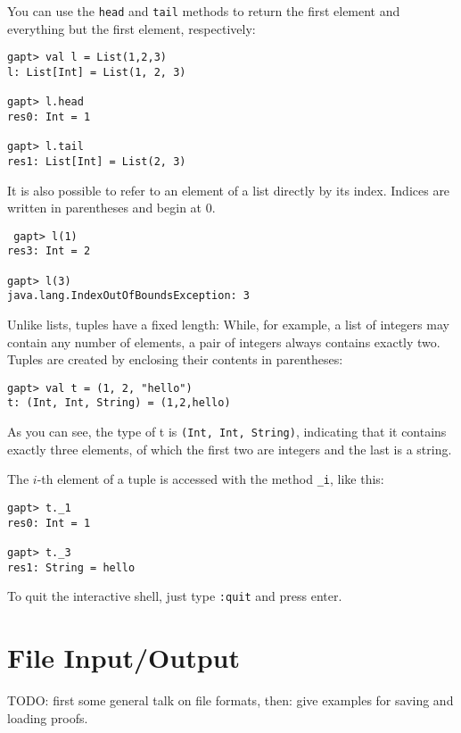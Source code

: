 \documentclass[a4paper,11pt]{article}
\newenvironment{meta}{\color{red}}{\color{black}} %
\begin{document}
You can use the \texttt{head} and \texttt{tail} methods to return the first
element and everything but the first element, respectively:

\begin{lstlisting}
gapt> val l = List(1,2,3)
l: List[Int] = List(1, 2, 3)

gapt> l.head
res0: Int = 1

gapt> l.tail
res1: List[Int] = List(2, 3)
\end{lstlisting}

It is also possible to refer to an element of a list directly by its index. Indices are
written in parentheses and begin at 0.

\begin{lstlisting}
 gapt> l(1)
res3: Int = 2

gapt> l(3)
java.lang.IndexOutOfBoundsException: 3
\end{lstlisting}

Unlike lists, tuples have a fixed length: While, for example, a list of integers may contain
any number of elements, a pair of integers always contains exactly two. Tuples are created
by enclosing their contents in parentheses:

\begin{lstlisting}
gapt> val t = (1, 2, "hello")
t: (Int, Int, String) = (1,2,hello)
\end{lstlisting}

As you can see, the type of t is \texttt{(Int, Int, String)}, indicating that it contains
exactly three elements, of which the first two are integers and the last is a string.

The $i$-th element of a tuple is accessed with the method \texttt{\_i}, like this:

\begin{lstlisting}
gapt> t._1
res0: Int = 1

gapt> t._3
res1: String = hello
\end{lstlisting}

To quit the interactive shell, just type \texttt{:quit} and press enter.


\section{File Input/Output}\label{sec.fileio}

\begin{meta}
TODO: first some general talk on file formats, then: give examples for saving and loading
proofs.
\end{meta}
\end{document}
